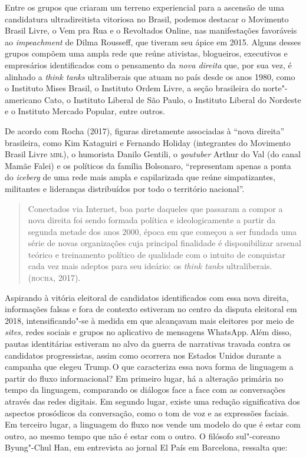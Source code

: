 Entre os grupos que criaram um terreno experiencial para a ascensão de
uma candidatura ultradireitista vitoriosa no Brasil, podemos destacar o
Movimento Brasil Livre, o Vem pra Rua e o Revoltados Online, nas
manifestações favoráveis ao \textit{impeachment} de Dilma Rousseff, que
tiveram seu ápice em 2015. Alguns desses grupos compõem uma ampla rede
que reúne ativistas, blogueiros, executivos e empresários identificados
com o pensamento da \textit{nova direita} que, por sua vez, é alinhado a
\textit{think tanks} ultraliberais que atuam no país desde os anos 1980,
como o Instituto Mises Brasil, o Instituto Ordem Livre, a seção
brasileira do norte"-americano Cato, o Instituto Liberal de São Paulo, o
Instituto Liberal do Nordeste e o Instituto Mercado Popular, entre
outros.

De acordo com Rocha (2017), figuras diretamente associadas à ``nova
direita'' brasileira, como Kim Kataguiri e Fernando Holiday (integrantes
do Movimento Brasil Livre \textsc{mbl}), o humorista Danilo Gentili, o
\textit{youtuber} Arthur do Val (do canal Mamãe Falei) e os políticos da
família Bolsonaro, ``representam apenas a ponta do \textit{iceberg} de uma
rede mais ampla e capilarizada que reúne simpatizantes, militantes e
lideranças distribuídos por todo o território nacional''.

\begin{quote}
Conectados via Internet, boa parte daqueles que passaram a compor a nova
direita foi sendo formada política e ideologicamente a partir da segunda
metade dos anos 2000, época em que começou a ser fundada uma série de
novas organizações cuja principal finalidade é disponibilizar arsenal
teórico e treinamento político de qualidade com o intuito de conquistar
cada vez mais adeptos para seu ideário: os \textit{think tanks} ultraliberais.
(\textsc{rocha}, 2017).
\end{quote}

Aspirando à vitória eleitoral de candidatos identificados com essa nova
direita, informações falsas e fora de contexto estiveram no centro da
disputa eleitoral em 2018, intensificando"-se à medida em que alcançavam
mais eleitores por meio de \textit{sites,} redes sociais e grupos no
aplicativo de mensagens WhatsApp.\,Além disso, pautas identitárias
estiveram no alvo da guerra de narrativas travada contra os candidatos
progressistas, assim como ocorrera nos Estados Unidos durante a campanha
que elegeu Trump.\,O que caracteriza essa nova forma de linguagem a
partir do fluxo informacional? Em primeiro lugar, há a alteração
primária no tempo da linguagem, comparando os diálogos face a face com
as conversações através das redes digitais. Em segundo lugar, existe uma
redução significativa dos aspectos prosódicos da conversação, como o tom
de voz e as expressões faciais. Em terceiro lugar, a linguagem do fluxo
nos vende um modelo do que é estar com outro, ao mesmo tempo que não é
estar com o outro. O filósofo sul"-coreano Byung"-Chul Han, em entrevista
ao jornal El País em Barcelona, ressalta que:

